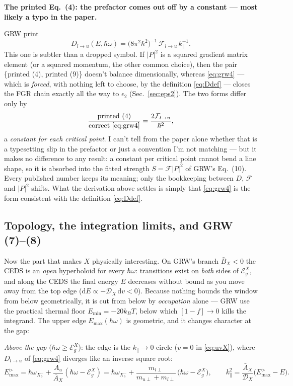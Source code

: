 \documentclass[11pt,a4paper]{article}
\newenvironment{printfix}[1]{%
  \begin{mdframed}[style=printfixstyle]%
  \noindent\textbf{\textcolor{BrickRed}{#1}}\par\smallskip\noindent\ignorespaces}%
  {\end{mdframed}}
\numberwithin{equation}{section}
\newcommand{\hw}{\hbar\omega}
\newcommand{\EgX}{\mathcal{E}_g^{X}}
\newcommand{\cD}{\mathcal{D}}
\newcommand{\cF}{\mathcal{F}}
\newcommand{\AX}{\bar{A}_X}
\newcommand{\BX}{\bar{B}_X}
\newcommand{\kpar}{k_{\parallel}}
\newcommand{\dd}{\mathrm{d}}
\newcommand{\wXsix}{\hbar\omega_{X_6^-}}
\begin{document}
\begin{printfix}{The printed Eq.~(4): the prefactor comes out off by a
constant --- most likely a typo in the paper.}
GRW print
\begin{equation*}
D_{l\to u}(E,\hw)=\bigl(8\pi^2\hbar^2\bigr)^{-1}\,
\cF_{l\to u}\,\kpar^{-1}. \tag{4, as printed}
\end{equation*}
This one is subtler than a dropped symbol. If $|P|^2$ is a squared
gradient matrix element (or a squared momentum, the other common
choice), then the pair \{printed (4), printed (9)\} doesn't balance
dimensionally, whereas \eqref{eq:grw4} --- which is \emph{forced},
with nothing left to choose, by the definition \eqref{eq:Ddef} ---
closes the FGR chain exactly all the way to $\epsilon_2$
(Sec.~\ref{sec:eps2}). The two forms differ only by
\[
\frac{\text{printed (4)}}{\text{correct }\eqref{eq:grw4}}
=\frac{2\cF_{l\to u}}{\hbar^2},
\]
a \emph{constant for each critical point}. I can't tell from the paper
alone whether that is a typesetting slip in the prefactor or just a
convention I'm not matching --- but it makes no difference to any
result: a constant per critical point cannot bend a line shape, so it
is absorbed into the fitted strength $S=\cF|P|^2$ of GRW's Eq.~(10).
Every published number keeps its meaning; only the bookkeeping between
$D$, $\cF$ and $|P|^2$ shifts. What the derivation above settles is
simply that \eqref{eq:grw4} is the form consistent with the definition
\eqref{eq:Ddef}.
\end{printfix}

\subsection{Topology, the integration limits, and GRW (7)--(8)}
\label{sec:Xtopology}

Now the part that makes $X$ physically interesting. On GRW's branch
$\BX<0$ the CEDS is an \emph{open} hyperboloid for every $\hw$:
transitions exist on \emph{both} sides of $\EgX$, and along the CEDS
the final energy $E$ decreases without bound as you move away from the
top edge ($\dd E\propto-\cD_X\,\dd v<0$). Because nothing bounds the
window from below geometrically, it is cut from below by
\emph{occupation} alone --- GRW use the practical thermal floor
$E_{\min}=-20k_BT$, below which $[1-f]\to0$ kills the integrand. The
upper edge $E_{\max}(\hw)$ is geometric, and it changes character at
the gap:

\medskip
\noindent
\emph{Above the gap} ($\hw\ge\EgX$): the edge is the $\kpar\to0$
circle ($v=0$ in \eqref{eq:uvX}), where $D_{l\to u}$ of
\eqref{eq:grw4} diverges like an inverse square root:
\begin{equation}
E_{\max}^{>}=\wXsix+\frac{A_u}{\AX}(\hw-\EgX)
=\wXsix+\frac{m_{l\perp}}{m_{u\perp}+m_{l\perp}}\,\bigl(\hw-\EgX\bigr),
\qquad
\kpar^2=\frac{\AX}{\cD_X}\bigl(E_{\max}^{>}-E\bigr).
\label{eq:EmaxAbove}
\end{equation}
\end{document}
